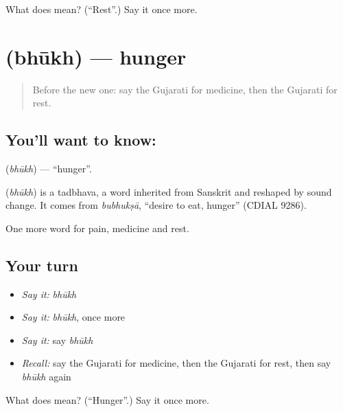 \begin{tcolorbox}[breakable,colback=teal!4,colframe=teal!35!black,title={Before you move on}]
What does  mean? (\textquotedblleft{}Rest\textquotedblright{}.) Say it once more.
\end{tcolorbox}
\section[\texorpdfstring{\gu{ભૂખ} (bhūkh)}{ભૂખ (bhūkh)}]{ (bhūkh) — hunger}

\label{lesson:GU-C49-hunger}



\begin{quote}
Before the new one: say the Gujarati for medicine, then the Gujarati for rest.
\end{quote}

\subsection*{You'll want to know: }
\textbf{} (\emph{bhūkh}) — \textquotedblleft{}hunger\textquotedblright{}.

\begin{cousinweb}
\textbf{} (\emph{bhūkh}) is a tadbhava, a word inherited from Sanskrit and reshaped by sound change. It comes from \emph{bubhukṣā}, \textquotedblleft{}desire to eat, hunger\textquotedblright{} (CDIAL 9286).
\end{cousinweb}

\begin{grammarlens}[title={What you've built}]
One more word for pain, medicine and rest.
\end{grammarlens}

\subsection*{Your turn}
\begin{itemize}
\raggedright
  \item \emph{Say it:} \emph{bhūkh}
  \item \emph{Say it:} \emph{bhūkh}, once more
  \item \emph{Say it:} say \emph{bhūkh}
  \item \emph{Recall:} say the Gujarati for medicine, then the Gujarati for rest, then say \emph{bhūkh} again
\end{itemize}

\begin{tcolorbox}[breakable,colback=teal!4,colframe=teal!35!black,title={Before you move on}]
What does  mean? (\textquotedblleft{}Hunger\textquotedblright{}.) Say it once more.
\end{tcolorbox}
